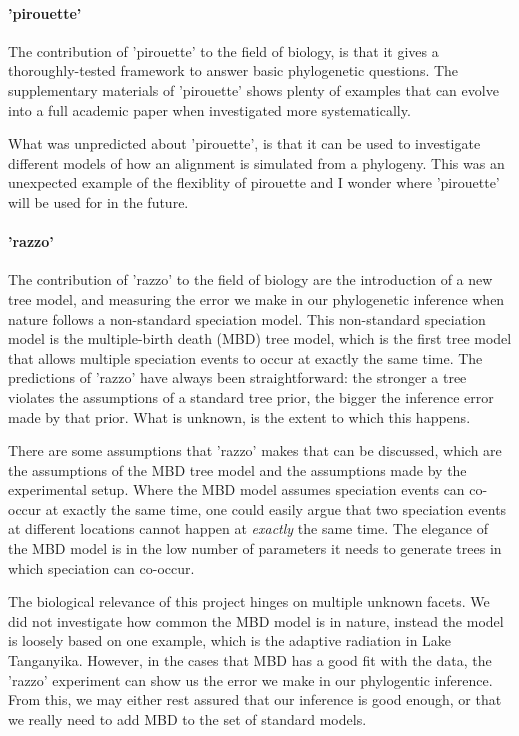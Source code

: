 \paragraph{'pirouette'} 

The contribution of 'pirouette' to the field of biology, 
is that it gives a thoroughly-tested framework to answer
basic phylogenetic questions. The supplementary materials 
of 'pirouette' shows plenty of examples that can evolve into
a full academic paper when investigated more systematically.

What was unpredicted about 'pirouette', is that it can be used to 
investigate different models of how an alignment is simulated
from a phylogeny. This was an unexpected example of the flexiblity of 
pirouette and I wonder where 'pirouette' will be used for in the future.

\paragraph{'razzo'} 

The contribution of 'razzo' to the field of biology
are the introduction of a new tree model, 
and measuring the error we make in our phylogenetic inference when
nature follows a non-standard speciation model.
This non-standard speciation model is the multiple-birth death (MBD) tree model,
which is the first tree model that allows multiple speciation events to occur 
at exactly the same time.
The predictions of 'razzo' have always been straightforward:
the stronger a tree violates the assumptions of a standard tree
prior, the bigger the inference error made by that prior.
What is unknown, is the extent to which this happens.

There are some assumptions that 'razzo' makes that can be discussed,
which are the assumptions of the MBD tree model and the assumptions
made by the experimental setup.
Where the MBD model assumes speciation events can co-occur at exactly
the same time, one could easily argue that two speciation events
at different locations cannot happen at \emph{exactly} the same time.
The elegance of the MBD model is in the low number of parameters it
needs to generate trees in which speciation can co-occur.

The biological relevance of this project hinges on multiple unknown
facets. We did not investigate how common the MBD model is in nature,
instead the model is loosely based on one example, which is the 
adaptive radiation in Lake Tanganyika. However,
in the cases that MBD has a good fit with the data, 
the 'razzo' experiment can show us the error we make in our phylogentic 
inference. From this, we may either rest assured that our inference is good 
enough, or that we really need to add MBD to the set of standard models.

